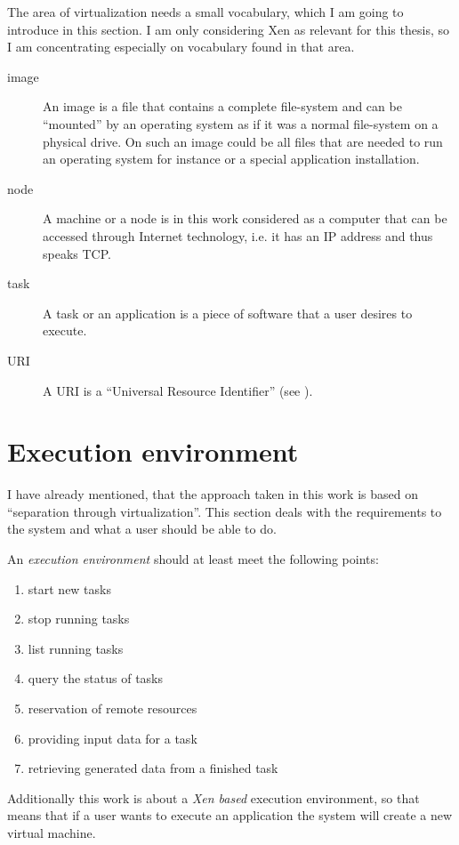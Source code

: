 The area of  virtualization needs a small vocabulary, which  I am going to
introduce in this section.  I am only considering Xen as relevant for this
thesis, so I am concentrating especially on vocabulary found in that area.
\begin{description}
\item[image] An image  is a file that contains  a complete file-system and
  can  be  ``mounted'' by  an  operating  system as  if  it  was a  normal
  file-system on  a physical drive.  On  such an image could  be all files
  that are  needed to run  an operating system  for instance or  a special
  application installation.
\item[node] A machine  or a node is in this work  considered as a computer
  that  can be accessed  through Internet  technology, i.e.  it has  an IP
  address and thus speaks TCP.
\item[task] A  task or an application is  a piece of software  that a user
  desires to execute.
\item[URI]   A   URI  is   a   ``Universal   Resource  Identifier''   (see
  \cite{rfc2396}).
\end{description}

\section{Execution environment}

I have already mentioned, that the approach taken in this work is based on
``separation  through  virtualization''.   This  section  deals  with  the
requirements to  the system  and what a  user should  be able to  do.

An \emph{execution environment} should at least meet the following points:
\begin{enumerate}
\item start new tasks
\item stop running tasks
\item list running tasks
\item query the status of tasks
\item reservation of remote resources
\item providing input data for a task
\item retrieving generated data from a finished task
\end{enumerate}

Additionally this work is  about a \emph{Xen based} execution environment,
so that  means that if a user  wants to execute an  application the system
will create a new virtual machine.

